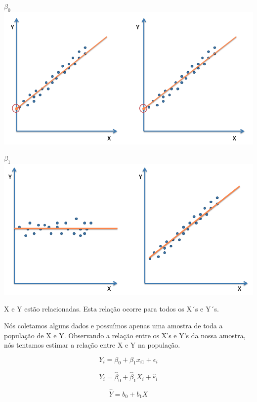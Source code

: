 \documentclass[
  9pt,
  ignorenonframetext,
  aspectratio=169]{beamer}
\begin{document}
\begin{frame}{\(\beta_0\)}
\protect\hypertarget{beta_0}{}
\includegraphics{imgs/beta0.png}
\end{frame}

\begin{frame}{\(\beta_1\)}
\protect\hypertarget{beta_1}{}
\includegraphics{imgs/beta1.png}
\end{frame}

\begin{frame}{}
\protect\hypertarget{section-1}{}
X e Y estão relacionadas. Esta relação ocorre para todos os X´s e Y´s.

Nós coletamos alguns dados e possuímos apenas uma amostra de toda a
população de X e Y. Observando a relação entre os X's e Y's da nossa
amostra, nós tentamos estimar a relação entre X e Y na população.

\[
Y_i = \beta_0 + \beta_1 x_{i1} + \epsilon_i
\]

\[
Y_{i}=\hat{\beta}_{0}+\hat{\beta}_{1} X_{i}+\hat{\varepsilon}_{i}
\]

\[
\hat{Y}=b_{0}+b_{1} X
\]
\end{frame}
\end{document}
